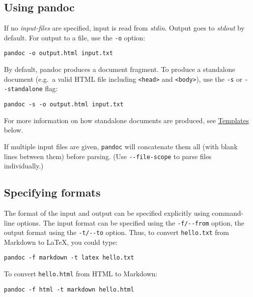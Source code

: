 \hypertarget{using-pandoc}{%
\subsection{Using pandoc}\label{using-pandoc}}

If no \emph{input-files} are specified, input is read from \emph{stdin}.
Output goes to \emph{stdout} by default. For output to a file, use the
\texttt{-o} option:

\begin{verbatim}
pandoc -o output.html input.txt
\end{verbatim}

By default, pandoc produces a document fragment. To produce a standalone
document (e.g.~a valid HTML file including
\texttt{\textless{}head\textgreater{}} and
\texttt{\textless{}body\textgreater{}}), use the \texttt{-s} or
\texttt{-\/-standalone} flag:

\begin{verbatim}
pandoc -s -o output.html input.txt
\end{verbatim}

For more information on how standalone documents are produced, see
\protect\hyperlink{templates}{Templates} below.

If multiple input files are given, \texttt{pandoc} will concatenate them
all (with blank lines between them) before parsing. (Use
\texttt{-\/-file-scope} to parse files individually.)

\hypertarget{specifying-formats}{%
\subsection{Specifying formats}\label{specifying-formats}}

The format of the input and output can be specified explicitly using
command-line options. The input format can be specified using the
\texttt{-f/-\/-from} option, the output format using the
\texttt{-t/-\/-to} option. Thus, to convert \texttt{hello.txt} from
Markdown to LaTeX, you could type:

\begin{verbatim}
pandoc -f markdown -t latex hello.txt
\end{verbatim}

To convert \texttt{hello.html} from HTML to Markdown:

\begin{verbatim}
pandoc -f html -t markdown hello.html
\end{verbatim}

